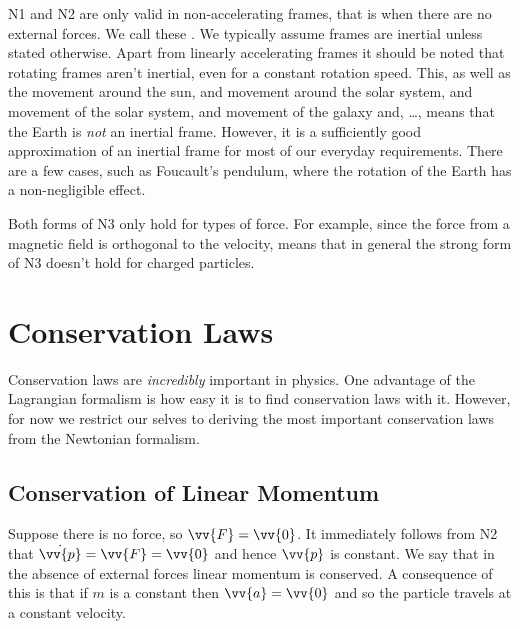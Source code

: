 \documentclass[fleqn]{NotesClass}
\begin{document}
    N1 and N2 are only valid in non-accelerating frames, that is when there are no external forces.
    We call these .
    We typically assume frames are inertial unless stated otherwise.
    Apart from linearly accelerating frames it should be noted that rotating frames aren't inertial, even for a constant rotation speed.
    This, as well as the movement around the sun, and movement around the solar system, and movement of the solar system, and movement of the galaxy and, \dots, means that the Earth is \emph{not} an inertial frame.
    However, it is a sufficiently good approximation of an inertial frame for most of our everyday requirements.
    There are a few cases, such as Foucault's pendulum, where the rotation of the Earth has a non-negligible effect.
    
    Both forms of N3 only hold for types of force.
    For example, since the force from a magnetic field is orthogonal to the velocity, means that in general the strong form of N3 doesn't hold for charged particles.
    
    \section{Conservation Laws}
    Conservation laws are \emph{incredibly} important in physics.
    One advantage of the Lagrangian formalism is how easy it is to find conservation laws with it.
    However, for now we restrict our selves to deriving the most important conservation laws from the Newtonian formalism.
    
    \subsection{Conservation of Linear Momentum}
    Suppose there is no force, so \(\vv{F} = \vv{0}\).
    It immediately follows from N2 that \(\dot{\vv{p}} = \vv{F} = \vv{0}\) and hence \(\vv{p}\) is constant.
    We say that in the absence of external forces linear momentum is conserved.
    A consequence of this is that if \(m\) is a constant then \(\vv{a} = \vv{0}\) and so the particle travels at a constant velocity.
    
\end{document}
